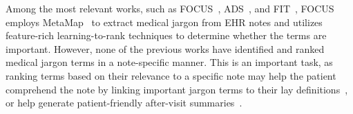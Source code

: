 Among the most relevant works, such as FOCUS~\cite{chenFindingImportantTerms2016a}, ADS~\cite{chenRankingMedicalTerms2017}, and FIT~\cite{chenUnsupervisedEnsembleRanking2017},
FOCUS~\cite{chenFindingImportantTerms2016a} employs MetaMap~\cite{aronson2010overview} to extract medical jargon from EHR notes and utilizes feature-rich learning-to-rank techniques to determine whether the terms are important.
However, none of the previous works have identified and ranked medical jargon terms in a note-specific manner.
This is an important task, as ranking terms based on their relevance to a specific note may help the patient comprehend the note by linking important jargon terms to their lay definitions~\cite{yao2023readme}, or help 
generate patient-friendly after-visit summaries~\cite{cai2022generation}.